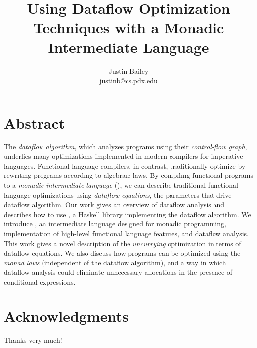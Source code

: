 \dodocclass



\date{}
\author{Justin Bailey \\ \url{justinb@cs.pdx.edu}}
\title{Using Dataflow Optimization Techniques with a Monadic Intermediate Language}
\maketitle 

\pagestyle{plain}
\section*{Abstract}
The \emph{dataflow algorithm}, which analyzes programs using
their \emph{control-flow graph}, underlies many optimizations
implemented in modern compilers for imperative languages. Functional
language compilers, in contrast, traditionally optimize by rewriting
programs according to algebraic laws. By compiling functional programs
to a \emph{monadic intermediate language} (\mil), we can describe
traditional functional language optimizations using \emph{dataflow
equations}, the parameters that drive dataflow algorithm. Our work
gives an overview of dataflow analysis and describes how to
use \hoopl, a Haskell library implementing the dataflow algorithm. We introduce
\mil, an intermediate language designed for monadic programming, 
implementation of high-level functional language features, and
dataflow analysis. This work gives a novel description of
the \emph{uncurrying} optimization in terms of dataflow equations. We
also discuss how \mil programs can be optimized using the \emph{monad
laws} (independent of the dataflow algorithm), and a way in which
dataflow analysis could eliminate unnecessary allocations in the
presence of conditional expressions. 
\newpage

\section*{Acknowledgments}
Thanks very much!
\newpage

\singlespacing
\tableofcontents
\newpage
{}
\listoffigures
\newpage

